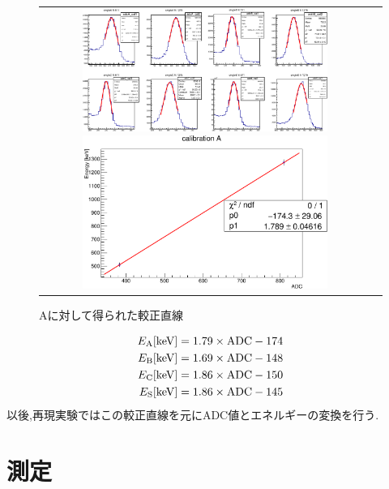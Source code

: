 \begin{figure}[htbp]
	\begin{tabular}{cc}
		\begin{minipage}{0.5\hsize}
			\centering
				\includegraphics[width=80mm]{fig/isb/gaussFit.pdf}
				\caption{ガウス関数によるフィッティング}
				\label{fig:fit_gauss}
		\end{minipage}
		\begin{minipage}{0.5\hsize}
			\centering
				\includegraphics[width=80mm]{fig/isb/fitA.pdf}
				\caption{Aに対して得られた較正直線}
				\label{fig:fitA}
		\end{minipage}
	\end{tabular}
\end{figure}
\begin{align}
	E_\textrm{A}\textrm{[keV]}=1.79\times {\rm ADC}-174 \nonumber \\ 
	E_\textrm{B}\textrm{[keV]}=1.69\times {\rm ADC}-148 \nonumber \\
	E_\textrm{C}\textrm{[keV]}=1.86\times {\rm ADC}-150 \nonumber \\
	E_\textrm{S}\textrm{[keV]}=1.86\times {\rm ADC}-145 \nonumber
\end{align}
以後,再現実験ではこの較正直線を元にADC値とエネルギーの変換を行う.

\section{測定}
